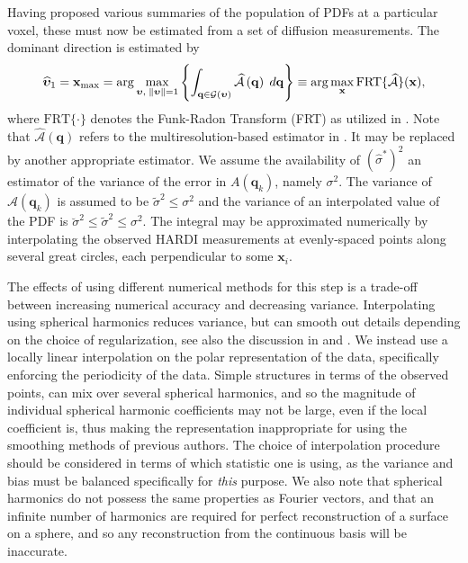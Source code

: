 \documentclass[dvips,aoas,preprint]{imsart}
\numberwithin{equation}{section}
\theoremstyle{plain}
\newcommand{\q}{\mathbf{q}}
\newcommand{\bu}{\bs{\upsilon}}
\newcommand{\x}{\mathbf{x}}
\newcommand{\cA}{\mathcal{A}}
\newcommand{\bs}[1]{\boldsymbol{#1}}
\newcommand{\wh}[1]{\widehat{#1}}
\begin{document}
Having proposed various summaries of the population of PDFs at a
particular voxel, these must now be estimated from a set of diffusion
measurements.  The dominant direction is estimated by
\begin{equation}
\label{eq:lala}
\widehat{\bu}_\text{1}= \x_\text{max}=\arg \max_{ \bu,\;\|\bu\|=1}\left\{
\int_{\q\in {\cal G}(\bu)}\widehat{\cA}\left(\q\right)\;d\q
\right\}\equiv \arg \max_{\x} \text{FRT}\{\wh\cA\}(\x),
\end{equation}
where $\text{FRT}\{\cdot\}$ denotes the Funk-Radon Transform (FRT) as
utilized in \citet{Tuch}.  Note that $\wh\cA(\q)$ refers to the
multiresolution-based estimator in \citet{OlhedeWhitcher}.  It may be
replaced by another appropriate estimator.  We assume the availability
of $(\wh{\sigma}^{\ast})^2$ an estimator of the variance of the error
in $A(\q_k)$, namely $\sigma^2$.  The variance of $\wh\cA(\q_k)$ is
assumed to be $\tilde{\sigma}^2\le \sigma^2$ and the variance of an
interpolated value of the PDF is
$\breve{\sigma}^2\le\tilde{\sigma}^2\le \sigma^2$.  The integral may
be approximated numerically by interpolating the observed HARDI
measurements at evenly-spaced points along several great circles, each
perpendicular to some $\x_i$.

The effects of using different numerical methods for this step is a
trade-off between increasing numerical accuracy and decreasing
variance.  Interpolating using spherical harmonics reduces variance,
but can smooth out details depending on the choice of regularization,
see also the discussion in \citet{Descoteaux} and \citet{Hess}.  We
instead use a locally linear interpolation on the polar representation
of the data, specifically enforcing the periodicity of the data.
Simple structures in terms of the observed points, can mix over
several spherical harmonics, and so the magnitude of individual
spherical harmonic coefficients may not be large, even if the local
coefficient is, thus making the representation inappropriate for using
the smoothing methods of previous authors.  The choice of
interpolation procedure should be considered in terms of which
statistic one is using, as the variance and bias must be balanced
specifically for {\em this} purpose.  We also note that spherical
harmonics do not possess the same properties as Fourier vectors, and
that an infinite number of harmonics are required for perfect
reconstruction of a surface on a sphere, and so any reconstruction from the continuous basis will be inaccurate.
\end{document}
